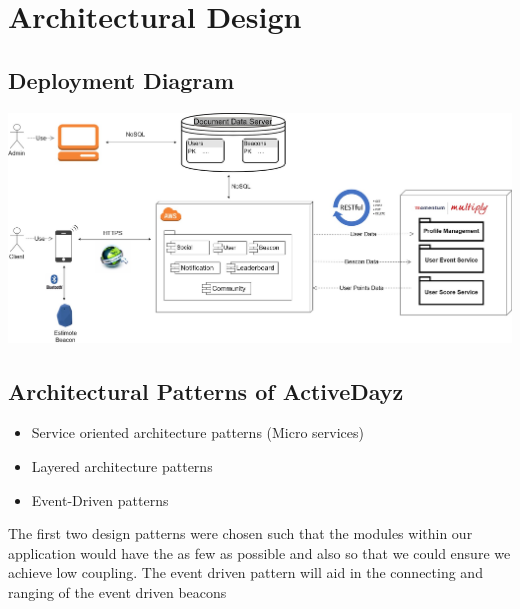\documentclass[11pt]{article}
\begin{document}
\section{Architectural Design}
\subsection{Deployment Diagram}
\includegraphics[width=175mm, scale=1.5]{images/Deployment.jpg}\\[1cm]
\subsection{Architectural Patterns of ActiveDayz}
\begin{itemize}
\item Service oriented architecture patterns (Micro services)
\item Layered architecture patterns
\item Event-Driven patterns
\end{itemize}
The first two design patterns were chosen such that the modules within our application would have the as few as possible and also so that we could ensure we achieve low coupling. The event driven pattern will aid in the connecting and ranging of the event driven beacons
\end{document}
